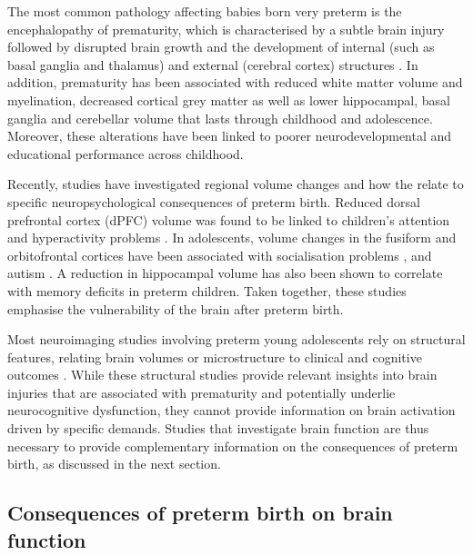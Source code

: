 The most common pathology affecting babies born very preterm is the encephalopathy of prematurity, which is characterised by a subtle brain injury followed by disrupted brain growth and the development of internal (such as basal ganglia and thalamus) and external (cerebral cortex) structures \citep{Kunz2014}. In addition, prematurity has been associated with reduced white matter volume and myelination, decreased cortical grey matter as well as lower hippocampal, basal ganglia and cerebellar volume that lasts through childhood and adolescence. Moreover, these alterations have been linked to poorer neurodevelopmental \citep{Inder2005,Ment2009,Nosarti2013,Padilla2015} and educational \citep{Cheong2013} performance across childhood.

 Recently, studies have investigated regional volume changes and how the relate to specific neuropsychological consequences of preterm birth. Reduced dorsal prefrontal cortex (dPFC) volume was found to be linked to children's attention and hyperactivity problems \citep{Bora2014}. In adolescents, volume changes in the fusiform and orbitofrontal cortices have been associated with socialisation problems \citep{Healy2013}, and autism \citep{Johnson2014}. A reduction in hippocampal volume has also been shown to correlate with memory deficits in preterm children. Taken together, these studies emphasise the vulnerability of the brain after preterm birth.

Most neuroimaging studies involving preterm young adolescents rely on structural features, relating brain volumes or microstructure to clinical and cognitive outcomes \citep{Huning2018, Groeschel2019, Boardman2020}. While these structural studies provide relevant insights into brain injuries that are associated with prematurity and potentially underlie neurocognitive dysfunction, they cannot provide information on brain activation driven by specific demands. Studies that investigate brain function are thus necessary to provide complementary information on the consequences of preterm birth, as discussed in the next section.




\subsection{Consequences of preterm birth on brain function}



